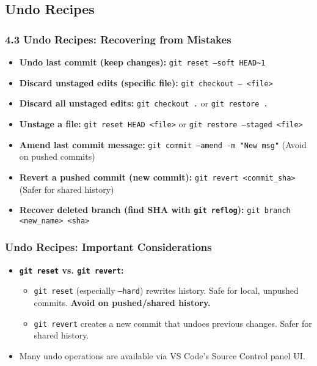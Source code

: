 \documentclass{beamer}
\begin{document}
\subsection{Undo Recipes}
\begin{frame}[fragile] %
  \frametitle{4.3 Undo Recipes: Recovering from Mistakes}
  \begin{itemize}
    \item \textbf{Undo last commit (keep changes):} \texttt{git reset --soft HEAD\textasciitilde1}
    \item \textbf{Discard unstaged edits (specific file):} \texttt{git checkout -- <file>}
    \item \textbf{Discard all unstaged edits:} \texttt{git checkout .} or \texttt{git restore .}
    \item \textbf{Unstage a file:} \texttt{git reset HEAD <file>} or \texttt{git restore --staged <file>}
    \item \textbf{Amend last commit message:} \texttt{git commit --amend -m "New msg"} (Avoid on pushed commits)
    \item \textbf{Revert a pushed commit (new commit):} \texttt{git revert <commit\_sha>} (Safer for shared history)
    \item \textbf{Recover deleted branch (find SHA with \texttt{git reflog}):} \texttt{git branch <new\_name> <sha>}
  \end{itemize}
\end{frame}

\begin{frame}
    \frametitle{Undo Recipes: Important Considerations}
    \begin{itemize}
        \item \textbf{\texttt{git reset} vs. \texttt{git revert}:}
        \begin{itemize}
            \item \texttt{git reset} (especially \texttt{--hard}) rewrites history. Safe for local, unpushed commits. \textbf{Avoid on pushed/shared history.}
            \item \texttt{git revert} creates a new commit that undoes previous changes. Safer for shared history.
        \end{itemize}
        \item Many undo operations are available via VS Code's Source Control panel UI.
    \end{itemize}
\end{frame}
\end{document}
